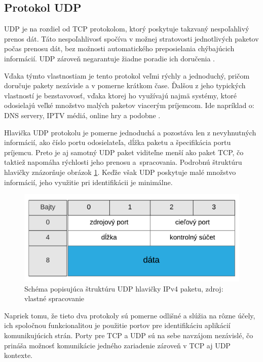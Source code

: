 \documentclass[
  digital, %
  oneside, %
  table,   %
  lof,     %
  nolot,   %
  nocover
]{fithesis3}
\begin{document}
\subsection{Protokol UDP}
UDP je na rozdiel od TCP protokolom, ktorý poskytuje takzvaný nespoľahlivý
prenos dát. Táto nespoľahlivosť spočíva v možnej stratovosti jednotlivých
paketov počas prenosu dát, bez možnosti automatického preposielania chýbajúcich
informácií. UDP zároveň negarantuje žiadne poradie ich doručenia \cite{rfc1122}.

Vďaka týmto
vlastnostiam je tento protokol veľmi rýchly a jednoduchý, pričom doručuje
pakety nezávisle a v pomerne krátkom čase. Ďalšou z jeho typických vlastností
je bezstavovosť, vďaka ktorej ho využívajú najmä systémy, ktoré odosielajú
veľké množstvo malých paketov viacerým príjemcom. Ide napríklad o: DNS servery,
IPTV médiá, online hry a podobne \cite{FIDIS:TCP}.

Hlavička UDP protokolu je pomerne jednoduchá a pozostáva len z nevyhnutných
informácií, ako číslo portu odosielateľa, dĺžka paketu a špecifikácia portu
príjemcu. Preto je aj samotný UDP paket viditeľne menší ako paket TCP, čo
taktiež napomáha rýchlosti jeho prenosu a~spracovania. Podrobnú štruktúru hlavičky
znázorňuje obrázok \ref{fig:net-udp-head}. Keďže však UDP poskytuje
malé množstvo informácií, jeho využitie pri identifikácii je minimálne.

\begin{figure}[t]
  \centering
    \includegraphics[width=.80\textwidth]{images/net-udp-head.png}
  \caption{Schéma popisujúca štruktúru UDP hlavičky IPv4 paketu, zdroj: vlastné spracovanie}
  \label{fig:net-udp-head}
\end{figure}

Napriek tomu, že tieto dva protokoly sú pomerne odlišné a slúžia na rôzne
účely, ich spoločnou funkcionalitou je použitie portov pre identifikáciu
aplikácií komunikujúcich strán. Porty pre TCP a UDP sú na sebe navzájom
nezávislé, čo prináša možnosť komunikácie jedného zariadenie zároveň v TCP aj
UDP kontexte.
\end{document}
